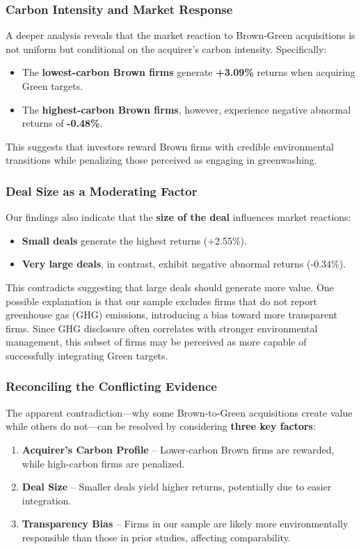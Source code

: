 \documentclass[a4paper]{article}
\begin{document}
\subsubsection{Carbon Intensity and Market Response}
A deeper analysis reveals that the market reaction to Brown-Green acquisitions is not uniform but conditional on the acquirer's carbon intensity. Specifically:
\begin{itemize}
    \item The \textbf{lowest-carbon Brown firms} generate \textbf{+3.09\%} returns when acquiring Green targets.
    \item The \textbf{highest-carbon Brown firms}, however, experience negative abnormal returns of \textbf{-0.48\%}.
\end{itemize}
This suggests that investors reward Brown firms with credible environmental transitions while penalizing those perceived as engaging in greenwashing.

\subsubsection{Deal Size as a Moderating Factor}
Our findings also indicate that the \textbf{size of the deal} influences market reactions:
\begin{itemize}
    \item \textbf{Small deals} generate the highest returns (+2.55\%).
    \item \textbf{Very large deals}, in contrast, exhibit negative abnormal returns (-0.34\%).
\end{itemize}
This contradicts suggesting that large deals should generate more value. One possible explanation is that our sample excludes firms that do not report greenhouse gas (GHG) emissions, introducing a bias toward more transparent firms. Since GHG disclosure often correlates with stronger environmental management, this subset of firms may be perceived as more capable of successfully integrating Green targets.

\subsubsection{Reconciling the Conflicting Evidence}
The apparent contradiction—why some Brown-to-Green acquisitions create value while others do not—can be resolved by considering \textbf{three key factors}:
\begin{enumerate}
    \item \textbf{Acquirer's Carbon Profile} – Lower-carbon Brown firms are rewarded, while high-carbon firms are penalized.
    \item \textbf{Deal Size} – Smaller deals yield higher returns, potentially due to easier integration.
    \item \textbf{Transparency Bias} – Firms in our sample are likely more environmentally responsible than those in prior studies, affecting comparability.
\end{enumerate}
\end{document}
